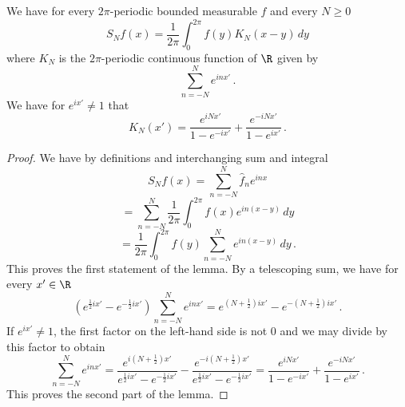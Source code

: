 \begin{lemma}
\label{Dirichlet-kernel}
\leanok
{}
We have for every $2\pi$-periodic bounded measurable $f$ and every $N\ge 0$
\begin{equation}
    S_Nf(x)=\frac 1{2\pi}\int_{0}^{2\pi}f(y) K_N(x-y)\, dy
\end{equation}
where $K_N$ is the $2\pi$-periodic continuous function of
$\R$ given by
\begin{equation}\label{eqksumexp}
\sum_{n=-N}^N e^{in x'}\, .
\end{equation}
We have for $e^{ix'}\neq 1$ that
\begin{equation}\label{eqksumhil}
    K_N(x')=\frac{e^{iNx'}}{1-e^{-ix'}}
      +\frac {e^{-iNx'}}{1-e^{ix'}} \, .
\end{equation}


\end{lemma}


\begin{proof}
\leanok
We have by definitions and interchanging sum and integral
   \begin{equation*}
        S_Nf(x)=\sum_{n=-N}^N \widehat{f}_n e^{inx}
    \end{equation*}
       \begin{equation*}
    =\sum_{n=-N}^N \frac 1{2\pi}\int_{0}^{2\pi}
    f(x) e^{in(x-y)}\, dy
    \end{equation*}
 \begin{equation}\label{eq-expsum}
     =\frac 1{2\pi}\int_{0}^{2\pi}
    f(y) \sum_{n=-N}^N e^{in(x-y)}\, dy\, .
 \end{equation}
This proves the first statement of the lemma.
By a telescoping sum, we have for every $x'\in \R$
\begin{equation}
    \left( e^{\frac 12 ix'}-e^{-\frac 12 ix'}\right) \sum_{n=-N}^N e^{inx'}= e^{(N+\frac 12) ix'}-e^{-(N+\frac 12) ix'}\, .
\end{equation}
If $e^{ix'}\neq 1$, the first factor on the left-hand side is not $0$ and we may divide by this factor to obtain
\begin{equation}
      \sum_{n=-N}^N e^{inx'}= \frac{e^{i(N+\frac 1 2)x'}}{e^{\frac 12 ix'}-e^{-\frac 12ix'}}
      -\frac{e^{-i(N+\frac 1 2)x'}}{e^{\frac 12 ix'}-e^{-\frac 12ix'}}
       =\frac{e^{iNx'}}{1-e^{-ix'}}
      +\frac {e^{-iNx'}}{1-e^{ix'}}\, .
\end{equation}
This proves the second part of the lemma.
\end{proof}

